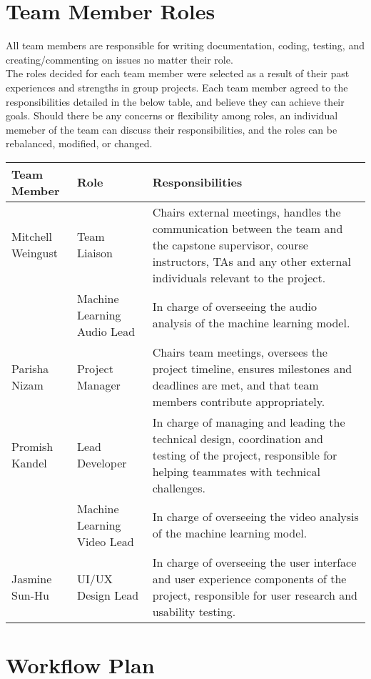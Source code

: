 \documentclass{article}
\begin{document}
\section{Team Member Roles}

All team members are responsible for writing documentation, coding, testing, and creating/commenting on issues no 
matter their role.\\
\indent The roles decided for each team member were selected as a result of their past experiences and strengths in group projects.
Each team member agreed to the responsibilities detailed in the below table, and believe they can achieve their goals.
Should there be any concerns or flexibility among roles, an individual memeber of the team can discuss their responsibilities,
and the roles can be rebalanced, modified, or changed.\\

\vspace{0.5cm}
\begin{tabularx}{\textwidth}{|l|l|X|}
  \hline
  \textbf{Team Member} & \textbf{Role} & \textbf{Responsibilities} \\
  \hline
  Mitchell Weingust & Team Liaison & Chairs external meetings, handles the communication between the team and the capstone 
  supervisor, course instructors, TAs and any other external individuals relevant to the project.\\
  \cline{2-3} & Machine Learning Audio Lead & In charge of overseeing the audio analysis of the machine learning model.\\
  \hline
  Parisha Nizam & Project Manager & Chairs team meetings, oversees the project timeline, ensures milestones and deadlines 
  are met, and that team members contribute appropriately.\\
  \hline
  Promish Kandel & Lead Developer & In charge of managing and leading the technical design, coordination and testing of the 
  project, responsible for helping teammates with technical challenges. \\
  \cline{2-3} & Machine Learning Video Lead & In charge of overseeing the video analysis of the machine learning model.\\
  \hline
  Jasmine Sun-Hu & UI/UX Design Lead & In charge of overseeing the user interface and user experience components of the project, 
  responsible for user research and usability testing.\\
  \hline
\end{tabularx}

\section{Workflow Plan}
\end{document}
